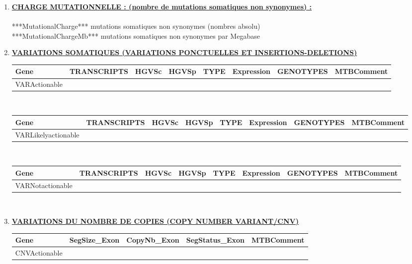 \documentclass[10pt]{article}
\newcommand{\beforetitle}{\vspace*{0.75cm}}
\newcommand{\aftertitle}{\vspace*{0.4cm}}
\begin{document}
\begin{itemize}[font=\Large, label=, leftmargin=*, wide = 0pt]
\begin{enumerate}[leftmargin=*, label=\Roman*/, wide = 0pt]

\item \textbf{\underline{CHARGE MUTATIONNELLE : (nombre de mutations somatiques non synonymes) :}}
\\
\\
***MutationalCharge*** mutations somatiques non synonymes (nombres absolu)\\
***MutationalChargeMb*** mutations somatiques non synonymes par Megabase\\
\item \textbf{\underline{VARIATIONS SOMATIQUES (VARIATIONS PONCTUELLES ET INSERTIONS-DELETIONS)}}
\\
\begin{itemize} [font=\large, label=, leftmargin=*, wide = 0pt]
\begin{tabulary}{\textwidth}{|p{1.5cm}|p{2cm}|p{1.5cm}|p{1.5cm}|p{1.5cm}|p{1.5cm}|p{1.5cm}|p{4cm}|}
\hline
\scriptsize Gene &\scriptsize TRANSCRIPTS &\scriptsize HGVSc &\scriptsize HGVSp &\scriptsize TYPE &\scriptsize Expression &\scriptsize GENOTYPES &\scriptsize MTBComment\tabularnewline
\hline
VARActionable
\end{tabulary}\\

\begin{tabulary}{\textwidth}{|p{1.5cm}|p{2cm}|p{1.5cm}|p{1.5cm}|p{1.5cm}|p{1.5cm}|p{1.5cm}|p{4cm}|}
\hline
\scriptsize Gene &\scriptsize TRANSCRIPTS &\scriptsize HGVSc &\scriptsize HGVSp &\scriptsize TYPE &\scriptsize Expression &\scriptsize GENOTYPES &\scriptsize MTBComment\tabularnewline
\hline
VARLikelyactionable
\end{tabulary}\\

\begin{tabulary}{\textwidth}{|p{1.5cm}|p{2cm}|p{1.5cm}|p{1.5cm}|p{1.5cm}|p{1.5cm}|p{1.5cm}|p{4cm}|}
\hline
\scriptsize Gene &\scriptsize TRANSCRIPTS &\scriptsize HGVSc &\scriptsize HGVSp &\scriptsize TYPE &\scriptsize Expression &\scriptsize GENOTYPES &\scriptsize MTBComment\tabularnewline
\hline
VARNotactionable
\end{tabulary}
\end{itemize}
\\
\beforetitle
\item \textbf{\underline{VARIATIONS DU NOMBRE DE COPIES (COPY NUMBER VARIANT/CNV)}}
\aftertitle
\begin{itemize} [font=\large, label=, leftmargin=*, wide = 0pt]
\begin{tabulary}{\textwidth}{|p{1.5cm}|p{1.5cm}|p{1.5cm}|p{2cm}|p{9,5cm}|}
\hline
\scriptsize Gene &\scriptsize SegSize\_Exon &\scriptsize CopyNb\_Exon &\scriptsize SegStatus\_Exon &\scriptsize MTBComment\tabularnewline
\hline
CNVActionable
\end{tabulary}\\


\end{itemize}
\end{enumerate}
\end{itemize}
\end{document}
